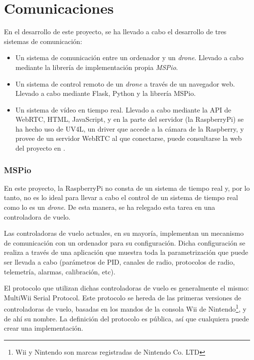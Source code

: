 \section{Comunicaciones}

En el desarrollo de este proyecto, se ha llevado a cabo el desarrollo de tres sistemas de comunicación: 

\begin{itemize}
\item Un sistema de comunicación entre un ordenador y un \emph{drone}. Llevado a cabo mediante la librería de implementación propia \emph{MSPio}.
\item Un sistema de control remoto de un \emph{drone} a través de un navegador web. Llevado a cabo mediante Flask, Python y la librería MSPio.
\item Un sistema de vídeo en tiempo real. Llevado a cabo mediante la API de WebRTC, HTML, JavaScript, y en la parte del servidor (la RaspberryPi) se ha hecho uso de UV4L, un driver que accede a la cámara de la Raspberry, y provee de un servidor WebRTC al que conectarse, puede consultarse la web del proyecto en \citep{wiki:uv4l}.
\end{itemize}

\subsubsection{MSPio}

En este proyecto, la RaspberryPi no consta de un sistema de tiempo real y, por lo tanto, no es lo ideal para llevar a cabo el control de un sistema de tiempo real como lo es un \emph{drone}. De esta manera, se ha relegado esta tarea en una controladora de vuelo. 

Las controladoras de vuelo actuales, en su mayoría, implementan un mecanismo de comunicación con un ordenador para su configuración. 
Dicha configuración se realiza a través de una aplicación que muestra toda la parametrización que puede ser llevada a cabo (parámetros de PID, canales de radio, protocolos de radio, telemetría, alarmas, calibración, etc).

El protocolo que utilizan dichas controladoras de vuelo es generalmente el mismo: MultiWii Serial Protocol. 
Este protocolo se hereda de las primeras versiones de controladoras de vuelo, basadas en los mandos de la consola Wii de Nintendo\footnote{Wii y Nintendo son marcas registradas de Nintendo Co. LTD}, y de ahí su nombre.
La definición del protocolo es pública, así que cualquiera puede crear una implementación. 


